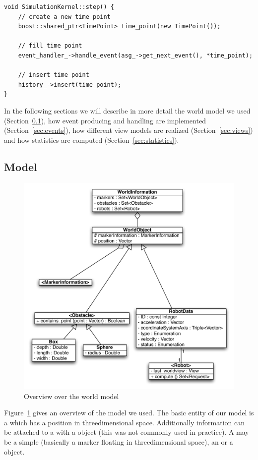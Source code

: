 \begin{lstlisting}
void SimulationKernel::step() {
	// create a new time point
	boost::shared_ptr<TimePoint> time_point(new TimePoint());

	// fill time point
	event_handler_->handle_event(asg_->get_next_event(), *time_point);

	// insert time point
	history_->insert(time_point);
}
\end{lstlisting}

\noindent
In the following sections we will describe in more detail the world model we used (Section~\ref{sec:model}), how event producing and handling are implemented (Section~\ref{sec:events}), how different view models are realized (Section~\ref{sec:views}) and how statistics are computed (Section~\ref{sec:statistics}).

\subsection{Model} \label{sec:model}

\begin{figure}
	\centering\includegraphics[width=0.75\linewidth]{chapter_reference_fig/model}
	\caption{Overview over the world model}\label{fig:model_overview}
\end{figure}

\noindent
Figure~\ref{fig:model_overview} gives an overview of the model we used. The basic entity of our model is a  which has a position in threedimensional space. Additionally information can be attached to a  with a  object (this was not commonly used in practice). A  may be a simple  (basically a marker floating in threedimensional space), an  or a  object. \smallskip

